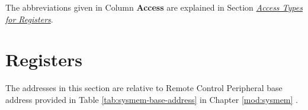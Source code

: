 \documentclass[main\_\_EN.tex]{subfiles}
\begin{document}
The abbreviations given in Column \textbf{Access} are explained in Section \hyperref[glossary-access-types]{\textit{Access Types for Registers}}.






\clearpage
\section{Registers}

The addresses in this section are relative to Remote Control Peripheral base address provided in Table \ref{tab:sysmem-base-address} in Chapter \ref{mod:sysmem} \textit{}.


\end{document}
